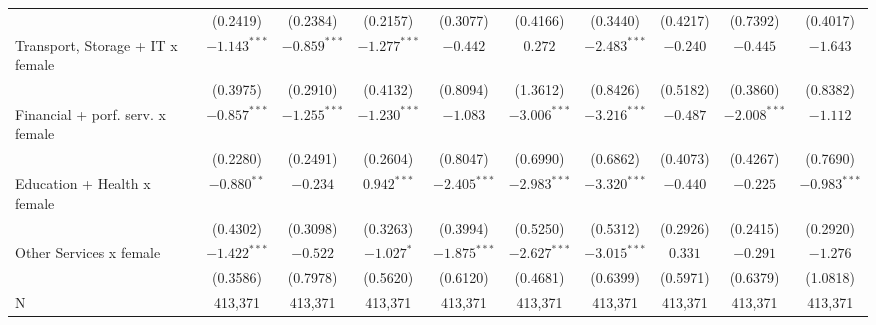 \begin{tabular}{l|ccc|ccc|ccc|}
                                 &        (0.2419) &        (0.2384) &        (0.2157) &        (0.3077) &        (0.4166) &        (0.3440) &        (0.4217) &        (0.7392) &        (0.4017) \\
Transport, Storage + IT x female &  $-1.143^{***}$ &  $-0.859^{***}$ &  $-1.277^{***}$ &        $-0.442$ &         $0.272$ &  $-2.483^{***}$ &        $-0.240$ &        $-0.445$ &        $-1.643$ \\
                                 &        (0.3975) &        (0.2910) &        (0.4132) &        (0.8094) &        (1.3612) &        (0.8426) &        (0.5182) &        (0.3860) &        (0.8382) \\
Financial + porf. serv. x female &  $-0.857^{***}$ &  $-1.255^{***}$ &  $-1.230^{***}$ &        $-1.083$ &  $-3.006^{***}$ &  $-3.216^{***}$ &        $-0.487$ &  $-2.008^{***}$ &        $-1.112$ \\
                                 &        (0.2280) &        (0.2491) &        (0.2604) &        (0.8047) &        (0.6990) &        (0.6862) &        (0.4073) &        (0.4267) &        (0.7690) \\
Education + Health x female      &   $-0.880^{**}$ &        $-0.234$ &   $0.942^{***}$ &  $-2.405^{***}$ &  $-2.983^{***}$ &  $-3.320^{***}$ &        $-0.440$ &        $-0.225$ &  $-0.983^{***}$ \\
                                 &        (0.4302) &        (0.3098) &        (0.3263) &        (0.3994) &        (0.5250) &        (0.5312) &        (0.2926) &        (0.2415) &        (0.2920) \\
Other Services x female          &  $-1.422^{***}$ &        $-0.522$ &      $-1.027^*$ &  $-1.875^{***}$ &  $-2.627^{***}$ &  $-3.015^{***}$ &         $0.331$ &        $-0.291$ &        $-1.276$ \\
                                 &        (0.3586) &        (0.7978) &        (0.5620) &        (0.6120) &        (0.4681) &        (0.6399) &        (0.5971) &        (0.6379) &        (1.0818) \\
N                                &         413,371 &         413,371 &         413,371 &         413,371 &         413,371 &         413,371 &         413,371 &         413,371 &         413,371 \\
\bottomrule
\end{tabular}
